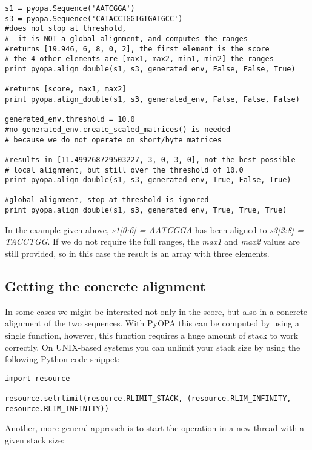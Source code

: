 \documentclass[12pt]{article}
\newcommand{\pp}{PyOPA}
\begin{document}
\begin{lstlisting}
s1 = pyopa.Sequence('AATCGGA')
s3 = pyopa.Sequence('CATACCTGGTGTGATGCC')
#does not stop at threshold,
#  it is NOT a global alignment, and computes the ranges
#returns [19.946, 6, 8, 0, 2], the first element is the score
# the 4 other elements are [max1, max2, min1, min2] the ranges
print pyopa.align_double(s1, s3, generated_env, False, False, True)

#returns [score, max1, max2]
print pyopa.align_double(s1, s3, generated_env, False, False, False)

generated_env.threshold = 10.0
#no generated_env.create_scaled_matrices() is needed
# because we do not operate on short/byte matrices

#results in [11.499268729503227, 3, 0, 3, 0], not the best possible
# local alignment, but still over the threshold of 10.0
print pyopa.align_double(s1, s3, generated_env, True, False, True)

#global alignment, stop at threshold is ignored
print pyopa.align_double(s1, s3, generated_env, True, True, True)
\end{lstlisting}

In the example given above, \emph{s1[0:6] = AATCGGA} has been aligned to \emph{s3[2:8] = TACCTGG}. If we do not require the full ranges, the \emph{max1} and \emph{max2} values are still provided, so in this case the result is an array with three elements.

\subsection{Getting the concrete alignment}
\label{subsec:concrete}

In some cases we might be interested not only in the score, but also in a concrete alignment of the two sequences. With \pp{} this can be computed by using a single function, however, this function requires a huge amount of stack to work correctly. On UNIX-based systems you can unlimit your stack size by using the following Python code snippet:
\begin{lstlisting}
import resource

resource.setrlimit(resource.RLIMIT_STACK, (resource.RLIM_INFINITY, resource.RLIM_INFINITY))
\end{lstlisting}

Another, more general approach is to start the operation in a new thread with a given stack size:
\end{document}
